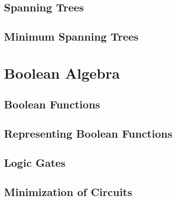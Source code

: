 \documentclass{article}
\begin{document}
\subsection{Spanning Trees }
\subsection{Minimum Spanning Trees }

\section{Boolean Algebra}

\subsection{Boolean Functions}
\subsection{Representing Boolean Functions}
\subsection{Logic Gates}
\subsection{Minimization of Circuits}
\end{document}
